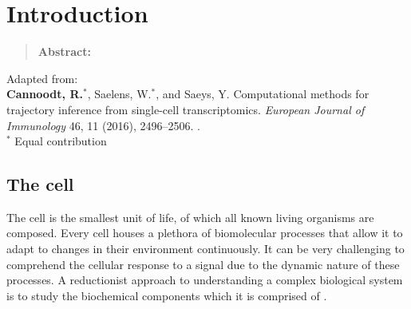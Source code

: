 \newpage{\thispagestyle{empty}\cleardoublepage}
\chapter{Introduction} 
\label{chap:introduction}

\begin{quote}
	\textbf{Abstract:} 
	
\end{quote}

\vfill

Adapted from:\\
\textbf{Cannoodt, R.}$^*$, Saelens, W.$^*$, and Saeys, Y. Computational methods for trajectory inference from single-cell transcriptomics. \textit{European Journal of Immunology} 46, 11 (2016), 2496--2506. .\\
{\footnotesize $^*$ Equal contribution}
\newpage

\section{The cell}
The cell is the smallest unit of life, of which all known living organisms are composed. Every cell houses a plethora of biomolecular processes that allow it to adapt to changes in their environment continuously. It can be very challenging to comprehend the cellular response to a signal due to the dynamic nature of these processes. A reductionist approach to understanding a complex biological system is to study the biochemical components which it is comprised of \cite{brigandt_reductionismbiology_2017}.

